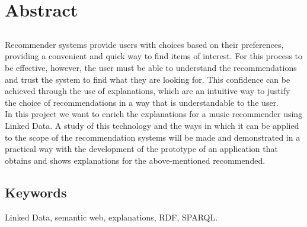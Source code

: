 \chapter*{Abstract}

\section*{\tituloPortadaEngVal}

Recommender systems provide users with choices based on their preferences, providing a convenient and quick way to find items of interest. For this process to be effective, however, the user must be able to understand the recommendations and trust the system to find what they are looking for. This confidence can be achieved through the use of explanations, which are an intuitive way to justify the choice of recommendations in a way that is understandable to the user.\\

In this project we want to enrich the explanations for a music recommender using Linked Data. A study of this technology and the ways in which it can be applied to the scope of the recommendation systems will be made and demonstrated in a practical way with the development of the prototype of an application that obtains and shows explanations for the above-mentioned recommended.\\


\section*{Keywords}

\noindent Linked Data, semantic web, explanations, RDF, SPARQL.



